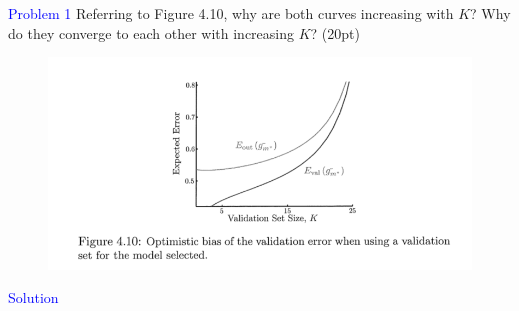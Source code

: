\textcolor{blue}{Problem 1}
Referring to Figure 4.10, why are both curves increasing with $K$? Why do they converge to each other with increasing $K$? (20pt)
\begin{figure}[htbp]
    \centering
    \includegraphics[width=1.0\textwidth]{../fig/figure.png}
\end{figure}
\par 
\textcolor{blue}{Solution}











\newpage